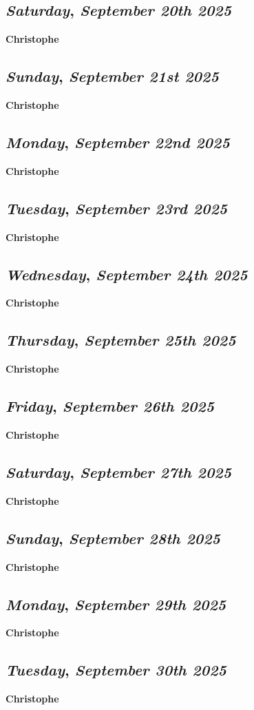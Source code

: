 \def\day{\textit{September 20th 2025}}
\def\weekday{\textit{Saturday}}
\subsection*{\weekday, \day}
\textbf {Christophe}

\def\day{\textit{September 21st 2025}}
\def\weekday{\textit{Sunday}}
\subsection*{\weekday, \day}
\textbf {Christophe}

\def\day{\textit{September 22nd 2025}}
\def\weekday{\textit{Monday}}
\subsection*{\weekday, \day}
\textbf {Christophe}

\def\day{\textit{September 23rd 2025}}
\def\weekday{\textit{Tuesday}}
\subsection*{\weekday, \day}
\textbf {Christophe}

\def\day{\textit{September 24th 2025}}
\def\weekday{\textit{Wednesday}}
\subsection*{\weekday, \day}
\textbf {Christophe}

\def\day{\textit{September 25th 2025}}
\def\weekday{\textit{Thursday}}
\subsection*{\weekday, \day}
\textbf {Christophe}

\def\day{\textit{September 26th 2025}}
\def\weekday{\textit{Friday}}
\subsection*{\weekday, \day}
\textbf {Christophe}

\def\day{\textit{September 27th 2025}}
\def\weekday{\textit{Saturday}}
\subsection*{\weekday, \day}
\textbf {Christophe}

\def\day{\textit{September 28th 2025}}
\def\weekday{\textit{Sunday}}
\subsection*{\weekday, \day}
\textbf {Christophe}

\def\day{\textit{September 29th 2025}}
\def\weekday{\textit{Monday}}
\subsection*{\weekday, \day}
\textbf {Christophe}

\def\day{\textit{September 30th 2025}}
\def\weekday{\textit{Tuesday}}
\subsection*{\weekday, \day}
\textbf {Christophe}
